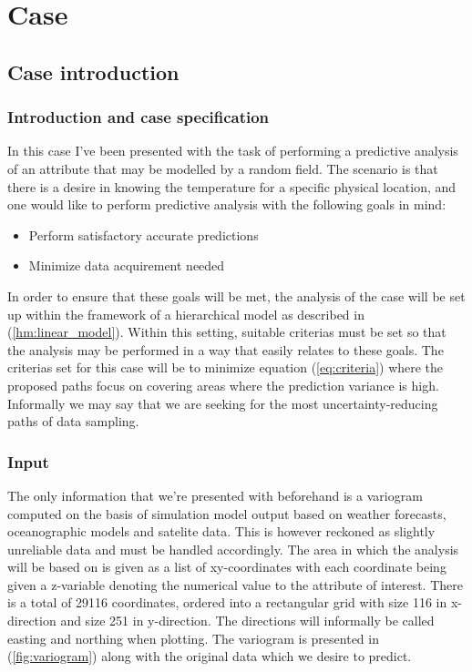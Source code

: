 \section{Case}
\subsection{Case introduction}
\subsubsection{Introduction and case specification} \label{subsub:goals}
In this case I've been presented with the task of performing a predictive analysis of an attribute that may be modelled by a random field. The scenario is that there is a desire in knowing the temperature for a specific physical location, and one would like to perform predictive analysis with the following goals in mind:
\begin{itemize} 
\item Perform satisfactory accurate predictions
\item Minimize data acquirement needed
\end{itemize} 
In order to ensure that these goals will be met, the analysis of the case will be set up within the framework of a hierarchical model as described in (\ref{hm:linear_model}). Within this setting, suitable criterias must be set so that the analysis may be performed in a way that easily relates to these goals. The criterias set for this case will be to minimize equation (\ref{eq:criteria}) where the proposed paths focus on covering areas where the prediction variance is high. Informally we may say that we are seeking for the most uncertainty-reducing paths of data sampling. 

\subsubsection{Input}
The only information that we're presented with beforehand is a variogram computed on the basis of simulation model output based on weather forecasts, oceanographic models and satelite data. This is however reckoned as slightly unreliable data and must be handled accordingly. The area in which the analysis will be based on is given as a list of xy-coordinates with each coordinate being given a z-variable denoting the numerical value to the attribute of interest. There is a total of 29116 coordinates, ordered into a rectangular grid with size 116 in x-direction and size 251 in y-direction. The directions will informally be called easting and northing when plotting. The variogram is presented in (\ref{fig:variogram}) along with the original data which we desire to predict. 

